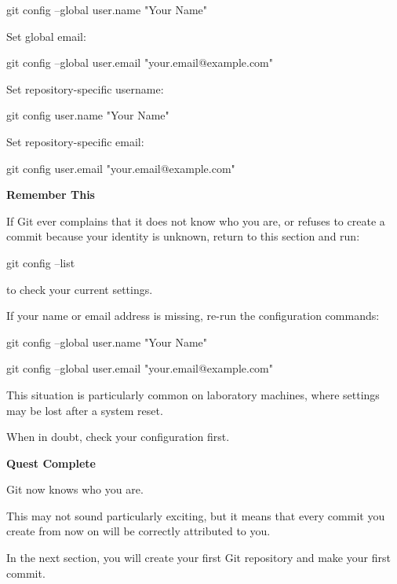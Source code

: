 \documentclass{csc2059practical}
\begin{document}
\begin{terminalplain}
git config --global user.name "Your Name"
\end{terminalplain}
Set global email:

\begin{terminalplain}
git config --global user.email "your.email@example.com"
\end{terminalplain}
Set repository-specific username:

\begin{terminalplain}
git config user.name "Your Name"
\end{terminalplain}
Set repository-specific email:

\begin{terminalplain}
git config user.email "your.email@example.com"
\end{terminalplain}
\begin{importantnote}
\textbf{Remember This}\par
\medskip

If Git ever complains that it does not know who you are, or refuses to create a commit because your identity is unknown, return to this section and run:


\end{importantnote}
\begin{terminalplain}
git config --list
\end{terminalplain}
to check your current settings.

If your name or email address is missing, re-run the configuration commands:

\begin{terminalplain}
git config --global user.name "Your Name"
\end{terminalplain}
\begin{terminalplain}
git config --global user.email "your.email@example.com"
\end{terminalplain}
This situation is particularly common on laboratory machines, where settings may be lost after a system reset.

When in doubt, check your configuration first.

\begin{wrapupbox}
\textbf{Quest Complete}\par
\medskip

Git now knows who you are.


This may not sound particularly exciting, but it means that every commit you create from now on will be correctly attributed to you.


In the next section, you will create your first Git repository and make your first commit.


\end{wrapupbox}
\end{document}
